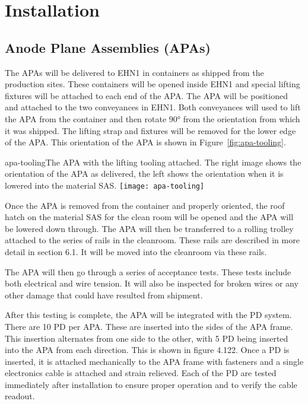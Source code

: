 
\section{Installation}


\subsection{Anode Plane Assemblies (APAs)}

The APAs will be delivered to EHN1 in containers as shipped from the production sites.  These containers will be opened inside EHN1 and special lifting fixtures will be attached to each end of the APA.  The APA will be positioned and attached to the two conveyances in EHN1.  Both conveyances will used to lift the APA from the container and then rotate 90° from the orientation from which it was shipped.  The lifting strap and fixtures will be removed for the lower edge of the APA.  This orientation of the APA is shown in Figure~\ref{fig:apa-tooling}.

\begin{cdrfigure}{apa-tooling}{The APA with the lifting tooling attached.  The right image shows the orientation of the APA as delivered, the left shows the orientation when it is lowered into the material SAS. }
\texttt{[image: apa-tooling]}
\end{cdrfigure}

Once the APA is removed from the container and properly oriented, the roof hatch on the material SAS for the clean room will be opened and the APA will be lowered down through.  The APA will then be transferred to a rolling trolley attached to the series of rails in the cleanroom.  These rails are described in more detail in section 6.1.  It will be moved into the cleanroom via these rails.  

The APA will then go through a series of acceptance tests.  These tests include both electrical and wire tension.  It will also be inspected for broken wires or any other damage that could have resulted from shipment.  

After this testing is complete, the APA will be integrated with the PD system.  There are 10 PD per APA.  These are inserted into the sides of the APA frame.  This insertion alternates from one side to the other, with 5 PD being inserted into the APA from each direction.  This is shown in figure 4.122.  Once a PD is inserted, it is attached mechanically to the APA frame with fasteners and a single electronics cable is attached and strain relieved.  Each of the PD are tested immediately after installation to ensure proper operation and to verify the cable readout.  

